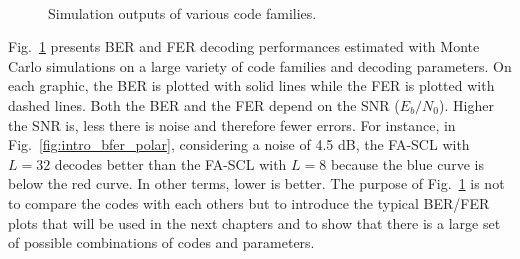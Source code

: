 \begin{figure}[htp]
  \centering
    \quad{}
     \quad{}
    \\
      \quad{}
   \quad{}
  \caption{Simulation outputs of various code families.}
  \label{fig:intro_bfer}
\end{figure}

Fig.~\ref{fig:intro_bfer} presents BER and FER decoding performances estimated
with Monte Carlo simulations on a large variety of code families and decoding
parameters. On each graphic, the BER is plotted with solid lines while the FER
is plotted with dashed lines. Both the BER and the FER depend on the SNR
($E_b/N_0$). Higher the SNR is, less there is noise and therefore fewer errors.
For instance, in Fig.~\ref{fig:intro_bfer_polar}, considering a noise of 4.5 dB,
the FA-SCL with $L = 32$ decodes better than the FA-SCL with $L = 8$ because
the {\color{Paired-1} blue} curve is below the {\color{Paired-5} red} curve. In
other terms, lower is better. The purpose of Fig.~\ref{fig:intro_bfer} is not
to compare the codes with each others but to introduce the typical BER/FER plots
that will be used in the next chapters and to show that there is a large set of
possible combinations of codes and parameters.




